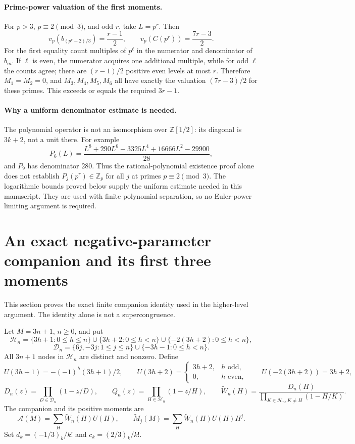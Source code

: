 \documentclass[11pt,letterpaper]{article}
\numberwithin{equation}{section}
\begin{document}
\paragraph{Prime-power valuation of the first moments.}
For $p>3$, $p\equiv2\pmod3$, and odd $r$, take $L=p^r$.
Then
\[
 v_p(b_{(p^r-2)/3})=\frac{r-1}{2},\qquad
 v_p(C(p^r))=\frac{7r-3}{2}.
\]
For the first equality count multiples of $p^\ell$ in the numerator
and denominator of $b_m$. If $\ell$ is even, the numerator acquires
one additional multiple, while for odd $\ell$ the counts agree;
there are $(r-1)/2$ positive even levels at most $r$.
Therefore $M_1=M_2=0$, and $M_3,M_4,M_5,M_6$ all have exactly the
valuation $(7r-3)/2$ for these primes. This exceeds or equals the
required $3r-1$.

\paragraph{Why a uniform denominator estimate is needed.}
The polynomial operator is not an isomorphism over
$\mathbb Z[1/2]$: its diagonal is $3k+2$, not a unit there.
For example
\[
 P_6(L)=\frac{L^8+290L^6-3325L^4+16666L^2-29900}{28},
\]
and $P_9$ has denominator $280$. Thus the rational-polynomial
existence proof alone does not establish $P_j(p^r)\in\mathbb Z_p$
for all $j$ at primes $p\equiv2\pmod3$. The logarithmic bounds proved below supply the uniform estimate
needed in this manuscript. They are used with finite polynomial
separation, so no Euler-power limiting argument is required.

\section{An exact negative-parameter companion and its first three moments}\label{loc-VIII-4}
\label{VIII-sec:E7companion}
This section proves the exact finite companion identity used in the
higher-level argument. The identity alone is not a supercongruence.

Let $M=3n+1$, $n\ge0$, and put
\[
 \mathcal H_n=\{3h+1:0\le h\le n\}
 \cup\{3h+2:0\le h<n\}\cup\{-2(3h+2):0\le h<n\},
\]
\[
 \mathcal D_n=\{6j,-3j:1\le j\le n\}
 \cup\{-3h-1:0\le h<n\}.
\]
All $3n+1$ nodes in $\mathcal H_n$ are distinct and nonzero. Define
\[
 U(3h+1)=-(-1)^h(3h+1)/2,\qquad
 U(3h+2)=\begin{cases}3h+2,&h\text{ odd},\\0,&h\text{ even},\end{cases}
 \qquad U(-2(3h+2))=3h+2,
\]
\[
 D_n(z)=\prod_{D\in\mathcal D_n}(1-z/D),\qquad
 Q_n(z)=\prod_{H\in\mathcal H_n}(1-z/H),\qquad
 \widetilde W_n(H)=\frac{D_n(H)}{\prod_{K\in\mathcal H_n,K\ne H}(1-H/K)}.
\]
The companion and its positive moments are
\[
 \mathcal A(M)=\sum_H\widetilde W_n(H)U(H),\qquad
 \widetilde M_j(M)=\sum_H\widetilde W_n(H)U(H)H^j.
\]
Set $d_k=(-1/3)_k/k!$ and $c_k=(2/3)_k/k!$.
\end{document}
